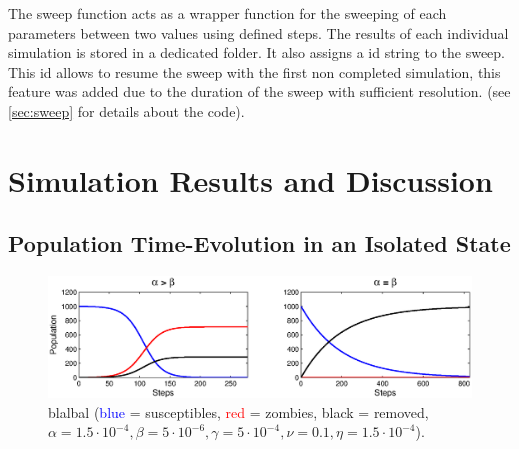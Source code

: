 \documentclass[11pt]{article} %
\begin{document}
The sweep function acts as a wrapper function for the sweeping of each parameters between two values using defined steps. The results of each individual simulation is stored in a dedicated folder. It also assigns a id string to the sweep. This id allows to resume the sweep with the first non completed simulation, this feature was added due to the duration of the sweep with sufficient resolution. (see \ref{sec:sweep} for details about the code).







\newpage
\section{Simulation Results and Discussion}\indent

\subsection{Population Time-Evolution in an Isolated State}\indent

\begin{figure}[h!]
\centerline{
\includegraphics[scale=0.65]{../images/Matlab_figures/model-AgeB.eps}}
\caption{blalbal (\textcolor{blue}{blue} = susceptibles, \textcolor{red}{red} = zombies, black = removed, $\alpha=1.5\cdot10^{-4}, \beta=5\cdot10^{-6}, \gamma=5\cdot10^{-4}, \nu=0.1, \eta=1.5\cdot10^{-4}$). \label{doomsday} }
\end{figure}
\end{document}
